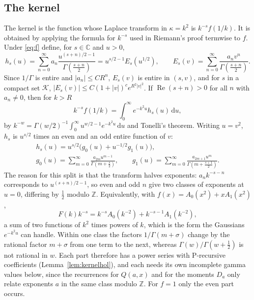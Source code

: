 \documentclass[11pt,reqno]{amsart}
\theoremstyle{definition}
\theoremstyle{remark}
\newcommand{\dd}{\,\mathrm{d}}
\newcommand{\ZZ}{\mathbb{Z}}
\newcommand{\CC}{\mathbb{C}}
\begin{document}
\subsection{The kernel}\label{sec:kernel}
The kernel is the function whose Laplace transform in $\kappa = k^2$ is $k^{-s}f(1/k)$. It is obtained by applying the
formula for $k^{-s}$ used in Riemann's proof termwise to $f$. Under \eqref{eq:f} define, for $s \in \CC$ and $u > 0$,
\begin{equation}\label{eq:kernel}
  h_s(u) = \sum_{n=0}^{\infty} a_n\frac{u^{(s+n)/2-1}}{\Gamma(\frac{s+n}{2})} = u^{s/2-1}E_s(u^{1/2}), \qquad
  E_s(v) = \sum_{n=0}^{\infty}\frac{a_nv^n}{\Gamma(\frac{s+n}2)}.
\end{equation}
Since $1/\Gamma$ is entire and $|a_n| \le CR^n$, $E_s(v)$ is entire in $(s,v)$, and for $s$ in a compact set $\mathcal K$,
$|E_s(v)| \le C(1+|v|)^{c}e^{R^2|v|^2}$. If $\operatorname{Re}(s+n) > 0$ for all $n$ with $a_n \ne 0$, then for
$k > R$
\begin{equation}\label{eq:laplace}
  k^{-s}f(1/k) = \int_0^\infty e^{-k^2u}h_s(u)\dd u,
\end{equation}
by $k^{-w} = \Gamma(w/2)^{-1}\int_0^\infty u^{w/2-1}e^{-k^2u}\dd u$ and Tonelli's theorem. Writing $u = v^2$,
$h_s$ is $u^{s/2}$ times an even and an odd entire function of $v$:
\begin{equation}\label{eq:kernelparts}
\begin{gathered}
  h_s(u) = u^{s/2}\bigl(g_0(u) + u^{-1/2}g_1(u)\bigr), \\
  g_0(u) = \sum_{m=0}^{\infty}\frac{a_{2m}u^{m-1}}{\Gamma(m+\frac s2)}, \qquad
  g_1(u) = \sum_{m=0}^{\infty}\frac{a_{2m+1}u^{m}}{\Gamma(m+\frac{s+1}2)}.
\end{gathered}
\end{equation}
The reason for this split is that the transform halves exponents: $a_nk^{-s-n}$ corresponds to $u^{(s+n)/2-1}$, so
even and odd $n$ give two classes of exponents at $u = 0$, differing by $\frac12$ modulo $\ZZ$. Equivalently, with
$f(x) = A_0(x^2) + xA_1(x^2)$,
\[
  F(k)k^{-s} = k^{-s}A_0(k^{-2}) + k^{-s-1}A_1(k^{-2}),
\]
a sum of two functions of $k^2$ times powers of $k$, which is the form the Gaussians $e^{-k^2u}$ can handle.
Within one class the factors $1/\Gamma(m+\sigma)$ change by the rational factor $m+\sigma$ from one term to the next,
whereas $\Gamma(w)/\Gamma(w+\frac12)$ is not rational in $w$. Each part therefore has a power series with P-recursive
coefficients (Lemma~\ref{lem:kernelhol}), and each needs its own incomplete gamma values below, since the recurrences
for $Q(a,x)$ and for the moments $D_a$ only relate exponents $a$ in the same class modulo $\ZZ$. For $f = 1$ only the
even part occurs.
\end{document}
